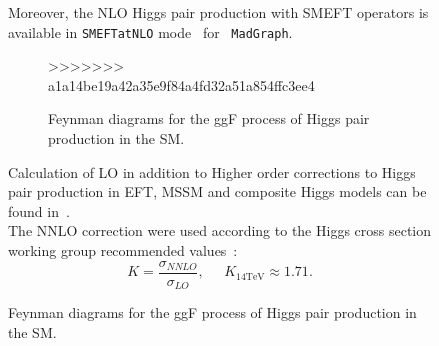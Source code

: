 \begin{figure}[!htpb]
%
Moreover, the NLO Higgs pair production with SMEFT operators is available in \texttt{SMEFTatNLO} mode~\cite{Degrande:2020evl} for ~\texttt{MadGraph}.
\begin{figure}[!htpb]
	\centering
	\caption{Feynman diagrams for the ggF process of Higgs pair production in the SM.} 
>>>>>>> a1a14be19a42a35e9f84a4fd32a51a854ffc3ee4
	\label{dihiggs-gridplot}
\end{figure}
%
Calculation of LO in addition to Higher order corrections to Higgs pair production in EFT, MSSM and composite Higgs models can be found in~\cite{Grober:2010yv,Grober:2015cwa,Grober:2017gut,deFlorian:2017qfk,Buchalla:2018yce}.\\ 
The NNLO correction were used according to the Higgs cross section working group recommended values~\cite{Dittmaier:2012vm,deFlorian:2016spz}:
\begin{equation}
	K = \frac{\sigma_{NNLO}}{\sigma_{LO}}, \;\;\;\;\; K_{14 \mathrm{TeV}} \approx 1.71.
\end{equation}

\end{figure}
